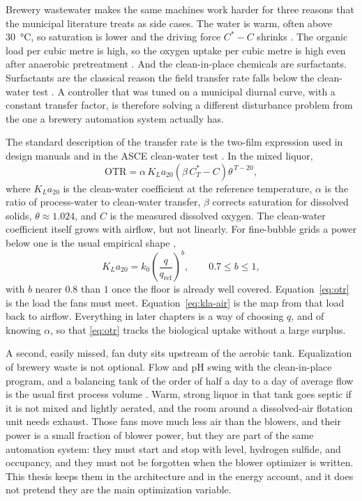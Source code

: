 Brewery wastewater makes the same machines work harder for three reasons that the municipal literature treats as side cases. The water is warm, often above \SI{30}{\celsius}, so saturation is lower and the driving force $C^{*}-C$ shrinks \cite{simate2011,fillaudeau2006}. The organic load per cubic metre is high, so the oxygen uptake per cubic metre is high even after anaerobic pretreatment \cite{ashraf2021,werkneh2019,batstone2002adm1}. And the clean-in-place chemicals are surfactants. Surfactants are the classical reason the field transfer rate falls below the clean-water test \cite{rosso2006alpha,mueller2002aeration}. A controller that was tuned on a municipal diurnal curve, with a constant transfer factor, is therefore solving a different disturbance problem from the one a brewery automation system actually has.

The standard description of the transfer rate is the two-film expression used in design manuals and in the ASCE clean-water test \cite{asce2007oxygen,pittoors2014,gillot2005}. In the mixed liquor,
\begin{equation}
\label{eq:otr}
\mathrm{OTR}
=
\alpha\,
K_La_{20}
\left(
\beta\,C^{*}_{T}-C
\right)
\theta^{\,T-20},
\end{equation}
where $K_La_{20}$ is the clean-water coefficient at the reference temperature, $\alpha$ is the ratio of process-water to clean-water transfer, $\beta$ corrects saturation for dissolved solids, $\theta\approx 1.024$, and $C$ is the measured dissolved oxygen. The clean-water coefficient itself grows with airflow, but not linearly. For fine-bubble grids a power below one is the usual empirical shape \cite{gillot2005,wagner1998},
\begin{equation}
\label{eq:kla-air}
K_La_{20}
=
k_{0}
\left(\frac{q}{q_{\mathrm{ref}}}\right)^{b},
\qquad
0.7 \le b \le 1,
\end{equation}
with $b$ nearer $0.8$ than $1$ once the floor is already well covered. Equation~\eqref{eq:otr} is the load the fans must meet. Equation~\eqref{eq:kla-air} is the map from that load back to airflow. Everything in later chapters is a way of choosing $q$, and of knowing $\alpha$, so that \eqref{eq:otr} tracks the biological uptake without a large surplus.

A second, easily missed, fan duty sits upstream of the aerobic tank. Equalization of brewery waste is not optional. Flow and pH swing with the clean-in-place program, and a balancing tank of the order of half a day to a day of average flow is the usual first process volume \cite{fillaudeau2006,simate2011}. Warm, strong liquor in that tank goes septic if it is not mixed and lightly aerated, and the room around a dissolved-air flotation unit needs exhaust. Those fans move much less air than the blowers, and their power is a small fraction of blower power, but they are part of the same automation system: they must start and stop with level, hydrogen sulfide, and occupancy, and they must not be forgotten when the blower optimizer is written. This thesis keeps them in the architecture and in the energy account, and it does not pretend they are the main optimization variable.

